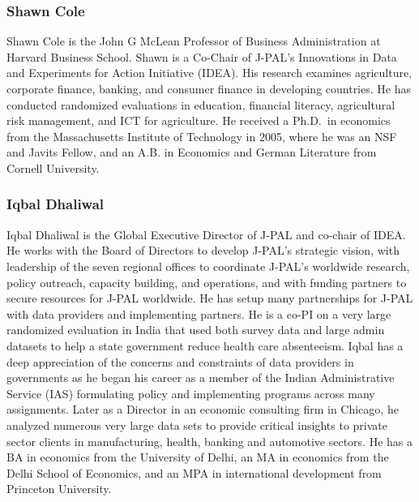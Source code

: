 \documentclass[
]{WileySix}
\begin{document}
\hypertarget{shawn-cole}{%
\subsubsection*{Shawn Cole}\label{shawn-cole}}

Shawn Cole is the John G McLean Professor of Business Administration at Harvard Business School. Shawn is a Co-Chair of J-PAL's Innovations in Data and Experiments for Action Initiative (IDEA). His research examines agriculture, corporate finance, banking, and consumer finance in developing countries. He has conducted randomized evaluations in education, financial literacy, agricultural risk management, and ICT for agriculture. He received a Ph.D.~in economics from the Massachusetts Institute of Technology in 2005, where he was an NSF and Javits Fellow, and an A.B. in Economics and German Literature from Cornell University.

\hypertarget{iqbal-dhaliwal}{%
\subsubsection*{Iqbal Dhaliwal}\label{iqbal-dhaliwal}}

Iqbal Dhaliwal is the Global Executive Director of J-PAL and co-chair of IDEA. He works with the Board of Directors to develop J-PAL's strategic vision, with leadership of the seven regional offices to coordinate J-PAL's worldwide research, policy outreach, capacity building, and operations, and with funding partners to secure resources for J-PAL worldwide. He has setup many partnerships for J-PAL with data providers and implementing partners. He is a co-PI on a very large randomized evaluation in India that used both survey data and large admin datasets to help a state government reduce health care absenteeism. Iqbal has a deep appreciation of the concerns and constraints of data providers in governments as he began his career as a member of the Indian Administrative Service (IAS) formulating policy and implementing programs across many assignments. Later as a Director in an economic consulting firm in Chicago, he analyzed numerous very large data sets to provide critical insights to private sector clients in manufacturing, health, banking and automotive sectors. He has a BA in economics from the University of Delhi, an MA in economics from the Delhi School of Economics, and an MPA in international development from Princeton University.
\end{document}
